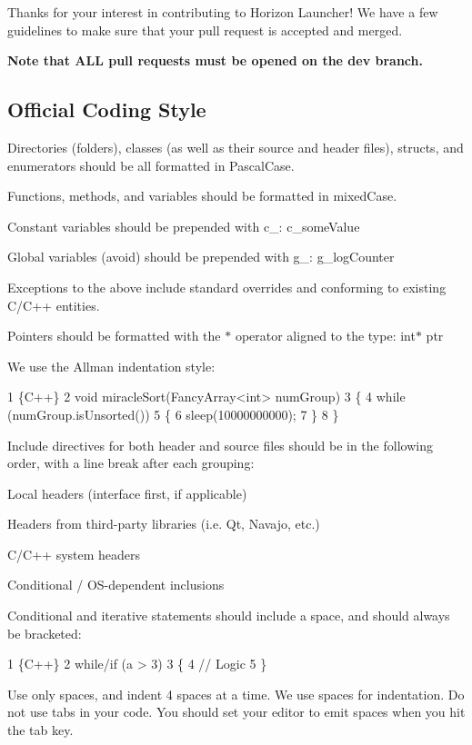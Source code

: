 Thanks for your interest in contributing to Horizon Launcher! We have a few guidelines to make sure that your pull request is accepted and merged.

{\bfseries Note that A\+L\+L pull requests must be opened on the \textquotesingle{}dev\textquotesingle{} branch.}

\subsection*{Official Coding Style}


\begin{DoxyItemize}
\item Directories (folders), classes (as well as their source and header files), structs, and enumerators should be all formatted in Pascal\+Case.
\item Functions, methods, and variables should be formatted in mixed\+Case.
\begin{DoxyItemize}
\item Constant variables should be prepended with {\ttfamily c\+\_\+}\+: {\ttfamily c\+\_\+some\+Value}
\item Global variables (avoid) should be prepended with {\ttfamily g\+\_\+}\+: {\ttfamily g\+\_\+log\+Counter}
\end{DoxyItemize}
\item Exceptions to the above include standard overrides and conforming to existing C/\+C++ entities.
\item Pointers should be formatted with the {\ttfamily $\ast$} operator aligned to the type\+: {\ttfamily int$\ast$ ptr}
\item We use the Allman indentation style\+: 
\begin{DoxyCode}
1 \{C++\}
2 void miracleSort(FancyArray<int> numGroup)
3 \{
4     while (numGroup.isUnsorted())
5     \{
6         sleep(10000000000);
7     \}
8 \}
\end{DoxyCode}

\item Include directives for both header and source files should be in the following order, with a line break after each grouping\+:
\begin{DoxyEnumerate}
\item Local headers (interface first, if applicable)
\item Headers from third-\/party libraries (i.\+e. Qt, Navajo, etc.)
\item C/\+C++ system headers
\item Conditional / O\+S-\/dependent inclusions
\end{DoxyEnumerate}
\item Conditional and iterative statements should include a space, and should always be bracketed\+: 
\begin{DoxyCode}
1 \{C++\}
2 while/if (a > 3) 
3 \{
4     // Logic
5 \}
\end{DoxyCode}

\item Use only spaces, and indent 4 spaces at a time. We use spaces for indentation. Do not use tabs in your code. You should set your editor to emit spaces when you hit the tab key.
\end{DoxyItemize}

